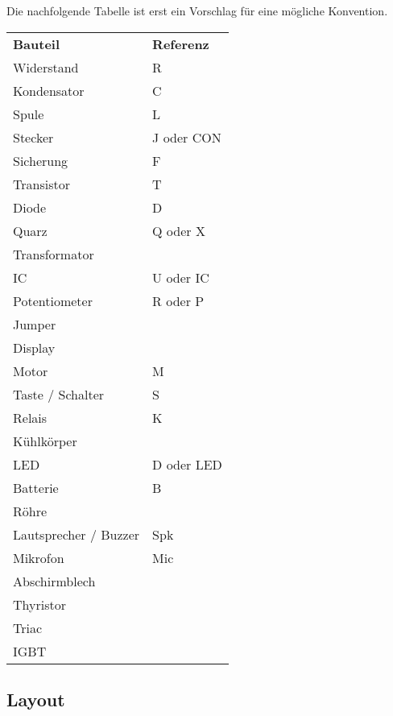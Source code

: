 Die nachfolgende Tabelle ist erst ein Vorschlag für eine mögliche Konvention. 
\begin{table}[h!]
  \begin{tabular}{ll}
  \textbf{Bauteil} 	    & \textbf{Referenz}\\
  Widerstand            & R \\
  Kondensator           & C \\
  Spule                 & L \\
  Stecker               & J oder CON \\
  Sicherung             & F \\
  Transistor            & T \\
  Diode                 & D \\
  Quarz                 & Q oder X \\
  Transformator         &  \\
  IC                    & U oder IC \\
  Potentiometer         & R oder P \\
  Jumper                &  \\
  Display               &  \\
  Motor                 & M \\
  Taste / Schalter      & S \\
  Relais                & K \\
  Kühlkörper            &  \\
  LED                   & D oder LED \\
  Batterie              & B \\
  Röhre                 &  \\
  Lautsprecher / Buzzer & Spk \\
  Mikrofon              & Mic \\
  Abschirmblech         &  \\
  Thyristor             &  \\
  Triac                 &  \\
  IGBT                  &  \\
  
  \end{tabular}
\end{table}

\subsection{Layout}